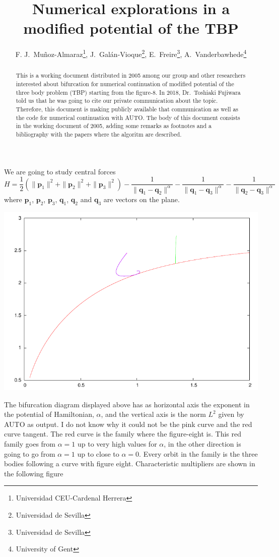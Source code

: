 \documentclass{article}
\title{Numerical explorations in a modified potential of the TBP}
\author{F. J.~Mu\~noz-Almaraz\footnote{Universidad CEU-Cardenal
    Herrera}, J.~Gal\'an-Vioque\footnote{Universidad de Sevilla}, E.~Freire\footnote{Universidad de Sevilla},
  A.~Vanderbawhede\footnote{University of Gent}}
\begin{document}
\maketitle
\begin{abstract}
  This is a working document distributed in 2005 among our group and other
  researchers interested about bifurcation for numerical continuation
  of modified potential of the three body problem (TBP) starting from
  the figure-8. In 2018, Dr.~Toshiaki Fujiwara told us that he was
  going to cite our private communication about the topic. Therefore,
 this document is making publicly available that communication as well
 as the code for numerical continuation  with AUTO. The body of this
 document consists in the working document of 2005, adding some
 remarks as footnotes and a bibliography with the papers where the
 algoritm are described. 
\end{abstract}
We are going to study central forces 
\begin{equation}
H=\frac 1 2 (\| \mathbf{p}_1\|^2 +\| \mathbf{p}_2\|^2+ \| \mathbf{p}_3\|^2) - \frac 1 {\|  \mathbf{q}_1-\mathbf{q}_2\|^{\alpha}}
-\frac 1 {\|  \mathbf{q}_1-\mathbf{q}_3\|^{\alpha}}-\frac 1 {\|  \mathbf{q}_2-\mathbf{q}_3\|^{\alpha}}
\end{equation}
where $\mathbf{p}_1$, $\mathbf{p}_2$, $\mathbf{p}_3$, $\mathbf{q}_1$, $\mathbf{q}_2$ and  $\mathbf{q}_3$ 
are vectors on the plane.
  
\includegraphics{bd.pdf}

The bifurcation diagram displayed above has as horizontal axis the exponent in the potential of Hamiltonian, $\alpha$, 
and the vertical axis is the norm $L^2$ given by AUTO as output. I do not know why it could not be the pink curve and  the red curve tangent.
The red curve is the family where the figure-eight is. This red family goes from $\alpha=1$ up to very high values for $\alpha$, in the other 
direction is going to go from $\alpha=1$ up to close to $\alpha=0$. Every orbit in the family is the three bodies following a curve with figure eight. 
Characteristic multipliers are shown in the following figure
\end{document}
